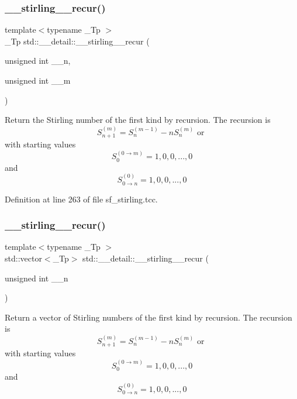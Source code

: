 \subsubsection{\texorpdfstring{\+\_\+\+\_\+stirling\+\_\+\_\+recur()}{\_\_stirling\_1\_recur()}\hspace{0.1cm}{\footnotesize\ttfamily [1/2]}}
{\footnotesize\ttfamily template$<$typename \+\_\+\+Tp $>$ \\
\+\_\+\+Tp std\+::\+\_\+\+\_\+detail\+::\+\_\+\+\_\+stirling\+\_\+\_\+recur (\begin{DoxyParamCaption}\item[{unsigned int}]{\+\_\+\+\_\+n,  }\item[{unsigned int}]{\+\_\+\+\_\+m }\end{DoxyParamCaption})}

Return the Stirling number of the first kind by recursion. The recursion is \[ S_{n+1}^{(m)} = S_n^{(m-1)} - n S_n^{(m)} \mbox{ or } \] with starting values \[ S_0^{(0\rightarrow m)} = {1, 0, 0, ..., 0} \] and \[ S_{0\rightarrow n}^{(0)} = {1, 0, 0, ..., 0} \] 

Definition at line 263 of file sf\+\_\+stirling.\+tcc.

\mbox{\label{namespacestd_1_1____detail_a2fe6ac62307cb1aded6ffae4dcc81f0b}} 
\subsubsection{\texorpdfstring{\+\_\+\+\_\+stirling\+\_\+\_\+recur()}{\_\_stirling\_1\_recur()}\hspace{0.1cm}{\footnotesize\ttfamily [2/2]}}
{\footnotesize\ttfamily template$<$typename \+\_\+\+Tp $>$ \\
std\+::vector$<$\+\_\+\+Tp$>$ std\+::\+\_\+\+\_\+detail\+::\+\_\+\+\_\+stirling\+\_\+\_\+recur (\begin{DoxyParamCaption}\item[{unsigned int}]{\+\_\+\+\_\+n }\end{DoxyParamCaption})}

Return a vector of Stirling numbers of the first kind by recursion. The recursion is \[ S_{n+1}^{(m)} = S_n^{(m-1)} - n S_n^{(m)} \mbox{ or } \] with starting values \[ S_0^{(0\rightarrow m)} = {1, 0, 0, ..., 0} \] and \[ S_{0\rightarrow n}^{(0)} = {1, 0, 0, ..., 0} \] 

